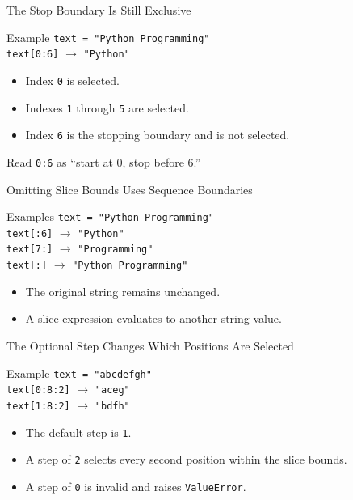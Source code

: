 \documentclass[aspectratio=169,10pt]{beamer}
\begin{document}
\begin{frame}{The Stop Boundary Is Still Exclusive}
  \begin{block}{Example}
    \texttt{text = "Python Programming"}\\[0.10in]
    \texttt{text[0:6]} $\longrightarrow$ \texttt{"Python"}
  \end{block}

  \begin{itemize}
    \item Index \texttt{0} is selected.
    \item Indexes \texttt{1} through \texttt{5} are selected.
    \item Index \texttt{6} is the stopping boundary and is not selected.
  \end{itemize}

  \begin{keyidea}
    Read \texttt{0:6} as ``start at 0, stop before 6.''
  \end{keyidea}
\end{frame}

\begin{frame}{Omitting Slice Bounds Uses Sequence Boundaries}
  \begin{block}{Examples}
    \texttt{text = "Python Programming"}\\[0.08in]
    \texttt{text[:6]} $\longrightarrow$ \texttt{"Python"}\\
    \texttt{text[7:]} $\longrightarrow$ \texttt{"Programming"}\\
    \texttt{text[:]} $\longrightarrow$ \texttt{"Python Programming"}
  \end{block}

  \begin{itemize}
    \item The original string remains unchanged.
    \item A slice expression evaluates to another string value.
  \end{itemize}
\end{frame}

\begin{frame}{The Optional Step Changes Which Positions Are Selected}
  \begin{block}{Example}
    \texttt{text = "abcdefgh"}\\[0.08in]
    \texttt{text[0:8:2]} $\longrightarrow$ \texttt{"aceg"}\\
    \texttt{text[1:8:2]} $\longrightarrow$ \texttt{"bdfh"}
  \end{block}

  \begin{itemize}
    \item The default step is \texttt{1}.
    \item A step of \texttt{2} selects every second position within the slice bounds.
    \item A step of \texttt{0} is invalid and raises \texttt{ValueError}.
  \end{itemize}
\end{frame}
\end{document}
